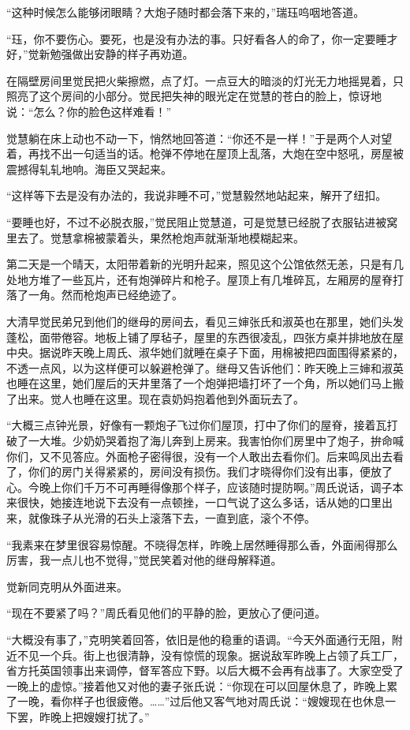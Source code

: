 \par “这种时候怎么能够闭眼睛？大炮子随时都会落下来的，”瑞珏呜咽地答道。
\par “珏，你不要伤心。要死，也是没有办法的事。只好看各人的命了，你一定要睡才好，”觉新勉强做出安静的样子再劝道。
\par 在隔壁房间里觉民把火柴擦燃，点了灯。一点豆大的暗淡的灯光无力地摇晃着，只照亮了这个房间的小部分。觉民把失神的眼光定在觉慧的苍白的脸上，惊讶地说：“怎么？你的脸色这样难看！”
\par 觉慧躺在床上动也不动一下，悄然地回答道：“你还不是一样！”于是两个人对望着，再找不出一句适当的话。枪弹不停地在屋顶上乱落，大炮在空中怒吼，房屋被震撼得轧轧地响。海臣又哭起来。
\par “这样等下去是没有办法的，我说非睡不可，”觉慧毅然地站起来，解开了纽扣。
\par “要睡也好，不过不必脱衣服，”觉民阻止觉慧道，可是觉慧已经脱了衣服钻进被窝里去了。觉慧拿棉被蒙着头，果然枪炮声就渐渐地模糊起来。
\par 第二天是一个晴天，太阳带着新的光明升起来，照见这个公馆依然无恙，只是有几处地方堆了一些瓦片，还有炮弹碎片和枪子。屋顶上有几堆碎瓦，左厢房的屋脊打落了一角。然而枪炮声已经绝迹了。
\par 大清早觉民弟兄到他们的继母的房间去，看见三婶张氏和淑英也在那里，她们头发蓬松，面带倦容。地板上铺了厚毡子，屋里的东西很凌乱，四张方桌并排地放在屋中央。据说昨天晚上周氏、淑华她们就睡在桌子下面，用棉被把四面围得紧紧的，不透一点风，以为这样便可以躲避枪弹了。继母又告诉他们：昨天晚上三婶和淑英也睡在这里，她们屋后的天井里落了一个炮弹把墙打坏了一个角，所以她们马上搬了出来。觉人也睡在这里。现在袁奶妈抱着他到外面玩去了。
\par “大概三点钟光景，好像有一颗炮子飞过你们屋顶，打中了你们的屋脊，接着瓦打破了一大堆。少奶奶哭着抱了海儿奔到上房来。我害怕你们房里中了炮子，拚命喊你们，又不见答应。外面枪子密得很，没有一个人敢出去看你们。后来鸣凤出去看了，你们的房门关得紧紧的，房间没有损伤。我们才晓得你们没有出事，便放了心。今晚上你们千万不可再睡得像那个样子，应该随时提防啊。”周氏说话，调子本来很快，她接连地说下去没有一点顿挫，一口气说了这么多话，话从她的口里出来，就像珠子从光滑的石头上滚落下去，一直到底，滚个不停。
\par “我素来在梦里很容易惊醒。不晓得怎样，昨晚上居然睡得那么香，外面闹得那么厉害，我一点儿也不觉得，”觉民笑着对他的继母解释道。
\par 觉新同克明从外面进来。
\par “现在不要紧了吗？”周氏看见他们的平静的脸，更放心了便问道。
\par “大概没有事了，”克明笑着回答，依旧是他的稳重的语调。“今天外面通行无阻，附近不见一个兵。街上也很清静，没有惊慌的现象。据说敌军昨晚上占领了兵工厂，省方托英国领事出来调停，督军答应下野。以后大概不会再有战事了。大家空受了一晚上的虚惊。”接着他又对他的妻子张氏说：“你现在可以回屋休息了，昨晚上累了一晚，看你样子也很疲倦。……”过后他又客气地对周氏说：“嫂嫂现在也休息一下罢，昨晚上把嫂嫂打扰了。”
